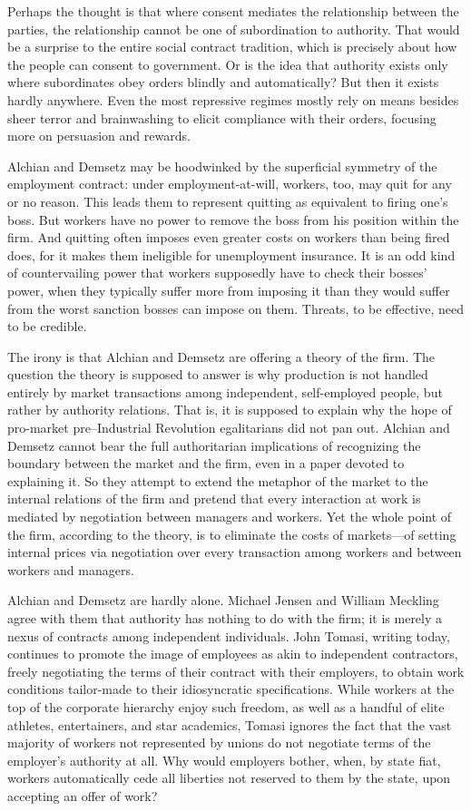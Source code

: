 \documentclass[
  letterpaper,
  11pt,
  DIV=9,
  openright]{scrbook}
\begin{document}
Perhaps the thought is that where consent mediates the relationship
between the parties, the relationship cannot be one of subordination to
authority. That would be a surprise to the entire social contract
tradition, which is precisely about how the people can consent to
government. Or is the idea that authority exists only where subordinates
obey orders blindly and automatically? But then it exists hardly
anywhere. Even the most repressive regimes mostly rely on means besides
sheer terror and brainwashing to elicit compliance with their orders,
focusing more on persuasion and rewards.

Alchian and Demsetz may be hoodwinked by the superficial symmetry of the
employment contract: under employment-at-will, workers, too, may quit
for any or no reason. This leads them to represent quitting as
equivalent to firing one's boss. But workers have no power to remove the
boss from his position within the firm. And quitting often imposes even
greater costs on workers than being fired does, for it makes them
ineligible for unemployment insurance. It is an odd kind of
countervailing power that workers supposedly have to check their bosses'
power, when they typically suffer more from imposing it than they would
suffer from the worst sanction bosses can impose on them. Threats, to be
effective, need to be credible.

The irony is that Alchian and Demsetz are offering a theory of the firm.
The question the theory is supposed to answer is why production is not
handled entirely by market transactions among independent, self-employed
people, but rather by authority relations. That is, it is supposed to
explain why the hope of pro-market pre--Industrial Revolution
egalitarians did not pan out. Alchian and Demsetz cannot bear the full
authoritarian implications of recognizing the boundary between the
market and the firm, even in a paper devoted to explaining it. So they
attempt to extend the metaphor of the market to the internal relations
of the firm and pretend that every interaction at work is mediated by
negotiation between managers and workers. Yet the whole point of the
firm, according to the theory, is to eliminate the costs of markets---of
setting internal prices via negotiation over every transaction among
workers and between workers and managers.

Alchian and Demsetz are hardly alone. Michael Jensen and William
Meckling agree with them that authority has nothing to do with the firm;
it is merely a nexus of contracts among independent individuals. John
Tomasi, writing today, continues to promote the image of employees as
akin to independent contractors, freely negotiating the terms of their
contract with their employers, to obtain work conditions tailor-made to
their idiosyncratic specifications. While workers at the top of the
corporate hierarchy enjoy such freedom, as well as a handful of elite
athletes, entertainers, and star academics, Tomasi ignores the fact that
the vast majority of workers not represented by unions do not negotiate
terms of the employer's authority at all. Why would employers bother,
when, by state fiat, workers automatically cede all liberties not
reserved to them by the state, upon accepting an offer of work?
\end{document}

